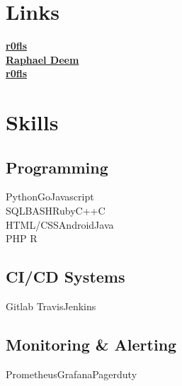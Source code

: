 \documentclass[]{deemweaver}
\begin{document}
%
%
\lastupdated

%
%


%
%

\begin{minipage}[t]{0.32\textwidth}


\section{Links}
{\FA \faGithub} \href{https://github.com/r0fls}{\bf r0fls} \\
{\FA \faLinkedin} \href{https://www.linkedin.com/in/raphael-deem-5757ba31}{\bf Raphael Deem} \\
{\FA \faStackOverflow}  \href{http://stackoverflow.com/users/1318734/rofls}{\bf r0fls} \\


\section{Skills}
\subsection{Programming}
Python\textbullet{}Go\textbullet{}Javascript\\
SQL\textbullet{}BASH\textbullet{}Ruby\textbullet{}C++\textbullet{}C\\
HTML/CSS\textbullet{}Android\textbullet{}Java\\
PHP \textbullet{}R
\sectionsep
\subsection{CI/CD Systems}
{}Gitlab \textbullet{} Travis\textbullet{}Jenkins
\sectionsep
\subsection{Monitoring \& Alerting}
Prometheus\textbullet{}Grafana\textbullet{}Pagerduty
\sectionsep

\end{minipage}
\end{document}
